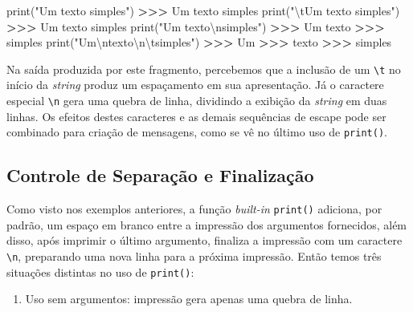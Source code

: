 \documentclass[
]{book}
\newenvironment{Shaded}{\begin{snugshade}}{\end{snugshade}}
\newcommand{\BuiltInTok}[1]{#1}
\newcommand{\CharTok}[1]{\textcolor[rgb]{0.31,0.60,0.02}{#1}}
\newcommand{\NormalTok}[1]{#1}
\newcommand{\OperatorTok}[1]{\textcolor[rgb]{0.81,0.36,0.00}{\textbf{#1}}}
\newcommand{\StringTok}[1]{\textcolor[rgb]{0.31,0.60,0.02}{#1}}
\providecommand{\tightlist}{%
  \setlength{\itemsep}{0pt}\setlength{\parskip}{0pt}}
\begin{document}
\begin{Shaded}
\begin{Highlighting}[]
\BuiltInTok{print}\NormalTok{(}\StringTok{"Um texto simples"}\NormalTok{)}
\OperatorTok{\textgreater{}\textgreater{}\textgreater{}}\NormalTok{ Um texto simples}
\BuiltInTok{print}\NormalTok{(}\StringTok{"}\CharTok{\textbackslash{}t}\StringTok{Um texto simples"}\NormalTok{)}
\OperatorTok{\textgreater{}\textgreater{}\textgreater{}}\NormalTok{     Um texto simples}
\BuiltInTok{print}\NormalTok{(}\StringTok{"Um texto}\CharTok{\textbackslash{}n}\StringTok{simples"}\NormalTok{)}
\OperatorTok{\textgreater{}\textgreater{}\textgreater{}}\NormalTok{ Um texto}
\OperatorTok{\textgreater{}\textgreater{}\textgreater{}}\NormalTok{ simples}
\BuiltInTok{print}\NormalTok{(}\StringTok{"Um}\CharTok{\textbackslash{}n}\StringTok{texto}\CharTok{\textbackslash{}n\textbackslash{}t}\StringTok{simples"}\NormalTok{)}
\OperatorTok{\textgreater{}\textgreater{}\textgreater{}}\NormalTok{ Um}
\OperatorTok{\textgreater{}\textgreater{}\textgreater{}}\NormalTok{ texto}
\OperatorTok{\textgreater{}\textgreater{}\textgreater{}}\NormalTok{     simples}
\end{Highlighting}
\end{Shaded}

Na saída produzida por este fragmento, percebemos que a inclusão de um \texttt{\textbackslash{}t} no início da \emph{string} produz um espaçamento em sua apresentação. Já o caractere especial \texttt{\textbackslash{}n} gera uma quebra de linha, dividindo a exibição da \emph{string} em duas linhas. Os efeitos destes caracteres e as demais sequências de escape pode ser combinado para criação de mensagens, como se vê no último uso de \texttt{print()}.

\hypertarget{e-s-saida-opcao}{%
\subsection{Controle de Separação e Finalização}\label{e-s-saida-opcao}}

Como visto nos exemplos anteriores, a função \emph{built-in} \texttt{print()} adiciona, por padrão, um espaço em branco entre a impressão dos argumentos fornecidos, além disso, após imprimir o último argumento, finaliza a impressão com um caractere \texttt{\textbackslash{}n}, preparando uma nova linha para a próxima impressão. Então temos três situações distintas no uso de \texttt{print()}:

\begin{enumerate}
\def\labelenumi{\arabic{enumi}.}
\tightlist
\item
  Uso sem argumentos: impressão gera apenas uma quebra de linha.
\end{enumerate}
\end{document}
